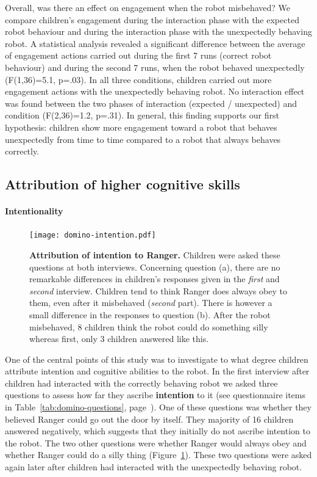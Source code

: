 \documentclass{sig-alternate}
\begin{document}
Overall, was there an effect on engagement when the robot misbehaved? We compare
children's engagement during the interaction phase with the expected robot
behaviour and during the interaction phase with the unexpectedly behaving robot.
A statistical analysis revealed a significant difference between the average of
engagement actions carried out during the first 7 runs (correct robot behaviour)
and during the second 7 runs, when the robot behaved unexpectedly (F(1,36)=5.1,
p=.03). In all three conditions, children carried out more engagement
actions with the unexpectedly behaving robot. No interaction effect was found
between the two phases of interaction (expected / unexpected) and condition
(F(2,36)=1.2, p=.31). In general, this finding supports our first hypothesis:
children show more engagement toward a robot that behaves unexpectedly from time
to time compared to a robot that always behaves correctly.

\subsection{Attribution of higher cognitive skills}

\paragraph{Intentionality}

\begin{figure}[h]
    \centering
    \texttt{[image: domino-intention.pdf]}
    \caption{\small \textbf{Attribution of
        intention to Ranger.} Children were asked these
        questions at both interviews. Concerning question (a), there are no remarkable
        differences in children's responses given in the \textit{first} and
        \textit{second} interview.  Children tend to think Ranger does always
        obey to them, even after it misbehaved (\textit{second} part). There is
        however a small difference in the responses to question (b).
        After the robot misbehaved, 8 children think the robot could do
        something silly whereas first, only 3 children answered like this.}
    
    \label{fig:domino-intention}

\end{figure}


One of the central points of this study was to investigate to what degree
children attribute intention and cognitive abilities to the robot.  In the first
interview after children had interacted with the correctly behaving robot we
asked three questions to assess how far they ascribe \textbf{intention} to it
(see questionnaire items in Table~\ref{tab:domino-questions},
page~\pageref{tab:domino-questions}). One of these questions was whether they
believed Ranger could go out the door by itself. They majority of 16 children
answered negatively, which suggests that they initially do not ascribe intention
to the robot. The two other questions were whether Ranger would always obey and
whether Ranger could do a silly thing (Figure~\ref{fig:domino-intention}). These
two questions were asked again later after children had interacted with the
unexpectedly behaving robot.
\end{document}
